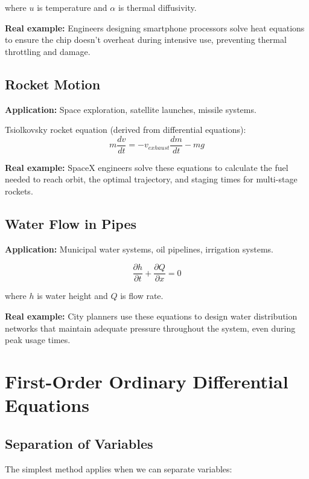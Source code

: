\documentclass{article}
\begin{document}
where $u$ is temperature and $\alpha$ is thermal diffusivity.

\textbf{Real example:} Engineers designing smartphone processors solve heat equations to ensure the chip doesn't overheat during intensive use, preventing thermal throttling and damage.

\subsection{Rocket Motion}

\textbf{Application:} Space exploration, satellite launches, missile systems.

Tsiolkovsky rocket equation (derived from differential equations):
\begin{equation}
m\frac{dv}{dt} = -v_{exhaust}\frac{dm}{dt} - mg
\end{equation}

\textbf{Real example:} SpaceX engineers solve these equations to calculate the fuel needed to reach orbit, the optimal trajectory, and staging times for multi-stage rockets.

\subsection{Water Flow in Pipes}

\textbf{Application:} Municipal water systems, oil pipelines, irrigation systems.

\begin{equation}
\frac{\partial h}{\partial t} + \frac{\partial Q}{\partial x} = 0
\end{equation}

where $h$ is water height and $Q$ is flow rate.

\textbf{Real example:} City planners use these equations to design water distribution networks that maintain adequate pressure throughout the system, even during peak usage times.

\section{First-Order Ordinary Differential Equations}

\subsection{Separation of Variables}

The simplest method applies when we can separate variables:
\end{document}
